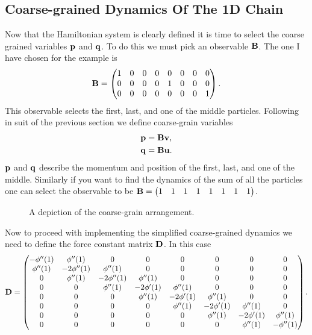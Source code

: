 \subsection{Coarse-grained Dynamics Of The 1D Chain}
Now that the Hamiltonian system is clearly defined it is time to select the coarse grained variables $\mathbf{p}$ and $\mathbf{q}$. To do this we must pick an observable $\mathbf{B}$. The one I have chosen for the example is  
\begin{align*}
\mathbf{B}=
\begin{pmatrix}
1 & 0 &0  &0  &0  &0  &0  & 0\\ 
 0& 0 &0  &0  &1  &0  &0  &0 \\ 
 0&  0&0  & 0 &0  &0  & 0 & 1
\end{pmatrix}.
\end{align*}
This observable selects the first, last, and one of the middle particles. Following in suit of the previous section we define coarse-grain variables 
\begin{align*}
\mathbf{p} &= \mathbf{B}\mathbf{v},\\
\mathbf{q} &=\mathbf{B}\mathbf{u}.
\end{align*}
$\mathbf{p}$ and $\mathbf{q}$ describe the momentum and position of the first, last, and one of the middle. Similarly if you want to find the dynamics of the sum of all the particles one can select the observable to be $\mathbf{B}=\begin{pmatrix}
1 & 1 & 1 & 1 & 1 & 1 & 1 & 1
\end{pmatrix}$.\\


\begin{figure}[h]
\centering
\def\svgscale{0.35}

\caption{A depiction of the coarse-grain arrangement.} \label{figure:3}
\end{figure}


Now to proceed with implementing the simplified coarse-grained dynamics we need to define the force constant matrix $\mathbf{D}$. In this case 
\begin{align*}
\mathbf{D} = \begin{pmatrix}
 -\phi''(1)& \phi''(1)  &0  & 0 &0  &0  &0  &0 \\ 
 \phi''(1)& -2\phi''(1)  & \phi''(1) & 0 &0  &0  &0 &0\\ 
0 & \phi''(1) & -2\phi''(1) &\phi''(1)  &0  &0  &0  &0 \\ 
 0&0  & \phi''(1) &  -2\phi'(1)&\phi''(1)  & 0 & 0 &0 \\ 
 0&0  &0  &\phi''(1) &  -2\phi'(1)&\phi''(1)&0  &0 \\ 
 0& 0 & 0 & 0 & \phi''(1) &  -2\phi'(1)&\phi''(1) & 0\\ 
 0& 0 & 0 &  0& 0 & \phi''(1) &  -2\phi'(1)&\phi''(1) \\ 
 0& 0 & 0 & 0 & 0 & 0&\phi''(1) & -\phi''(1)  
\end{pmatrix}.
\end{align*}

